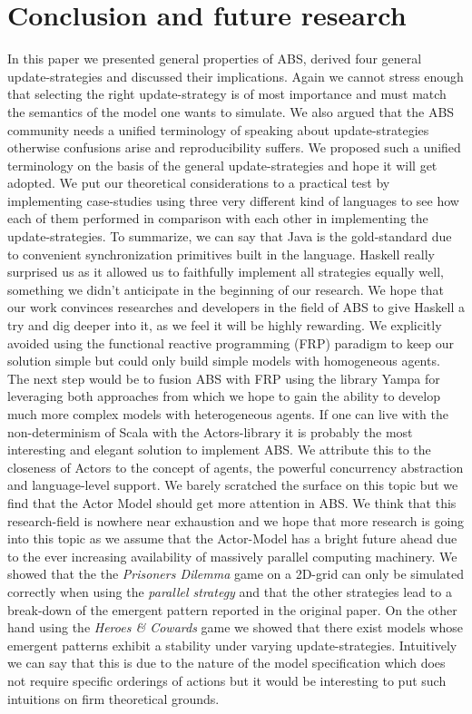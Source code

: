 \section{Conclusion and future research}
In this paper we presented general properties of ABS, derived four general update-strategies and discussed their implications. Again we cannot stress enough that selecting the right update-strategy is of most importance and must match the semantics of the model one wants to simulate.
We also argued that the ABS community needs a unified terminology of speaking about update-strategies otherwise confusions arise and reproducibility suffers. We proposed such a unified terminology on the basis of the general update-strategies and hope it will get adopted.
We put our theoretical considerations to a practical test by implementing case-studies using three very different kind of languages to see how each of them performed in comparison with each other in implementing the update-strategies. To summarize, we can say that Java is the gold-standard due to convenient synchronization primitives built in the language. Haskell really surprised us as it allowed us to faithfully implement all strategies equally well, something we didn't anticipate in the beginning of our research. We hope that our work convinces researches and developers in the field of ABS to give Haskell a try and dig deeper into it, as we feel it will be highly rewarding. We explicitly avoided using the functional reactive programming (FRP) paradigm to keep our solution simple but could only build simple models with homogeneous agents. The next step would be to fusion ABS with FRP using the library Yampa for leveraging both approaches from which we hope to gain the ability to develop much more complex models with heterogeneous agents. 
If one can live with the non-determinism of Scala with the Actors-library it is probably the most interesting and elegant solution to implement ABS. We attribute this to the closeness of Actors to the concept of agents, the powerful concurrency abstraction and language-level support. We barely scratched the surface on this topic but we find that the Actor Model should get more attention in ABS. We think that this research-field is nowhere near exhaustion and we hope that more research is going into this topic as we assume that the Actor-Model has a bright future ahead due to the ever increasing availability of massively parallel computing machinery.
We showed that the the \textit{Prisoners Dilemma} game on a 2D-grid can only be simulated correctly when using the \textit{parallel strategy} and that the other strategies lead to a break-down of the emergent pattern reported in the original paper. On the other hand using the \textit{Heroes \& Cowards} game we showed that there exist models whose emergent patterns exhibit a stability under varying update-strategies. Intuitively we can say that this is due to the nature of the model specification which does not require specific orderings of actions but it would be interesting to put such intuitions on firm theoretical grounds.